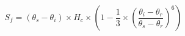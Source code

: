\begin{equation}
\label{Sf_equation}
S_f=(\theta_s-\theta_i)\times H_c \times \left(1-\frac{1}{3}\times \left( \frac{\theta_i-\theta_r}{\theta_s-\theta_r} \right) ^6 \right)
\end{equation}
